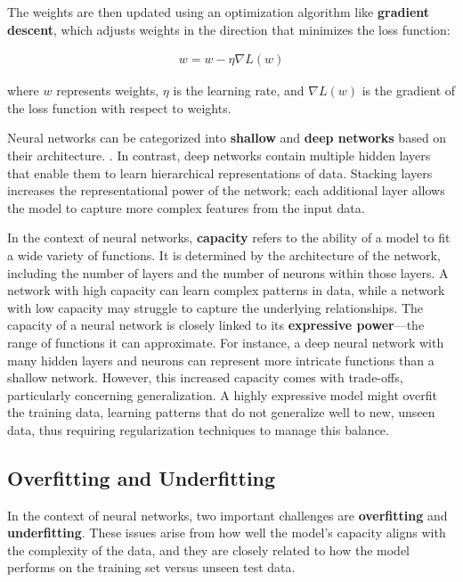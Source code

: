 The weights are then updated using an optimization algorithm like \textbf{gradient descent}, which adjusts weights in the direction that minimizes the loss function:

\begin{align}
  w = w - \eta \nabla L(w)  
\end{align}

where \(w\) represents weights, \(\eta\) is the learning rate, and \(\nabla L(w)\) is the gradient of the loss function with respect to weights.

Neural networks can be categorized into \textbf{shallow} and \textbf{deep networks} based on their architecture. . In contrast, deep networks contain multiple hidden layers that enable them to learn hierarchical representations of data. Stacking layers increases the representational power of the network; each additional layer allows the model to capture more complex features from the input data.

In the context of neural networks, \textbf{capacity} refers to the ability of a model to fit a wide variety of functions. It is determined by the architecture of the network, including the number of layers and the number of neurons within those layers. A network with high capacity can learn complex patterns in data, while a network with low capacity may struggle to capture the underlying relationships. The capacity of a neural network is closely linked to its \textbf{expressive power}—the range of functions it can approximate. For instance, a deep neural network with many hidden layers and neurons can represent more intricate functions than a shallow network. However, this increased capacity comes with trade-offs, particularly concerning generalization. A highly expressive model might overfit the training data, learning patterns that do not generalize well to new, unseen data, thus requiring regularization techniques to manage this balance.


\subsection{Overfitting and Underfitting}

In the context of neural networks, two important challenges are \textbf{overfitting} and \textbf{underfitting}. These issues arise from how well the model's capacity aligns with the complexity of the data, and they are closely related to how the model performs on the training set versus unseen test data.

